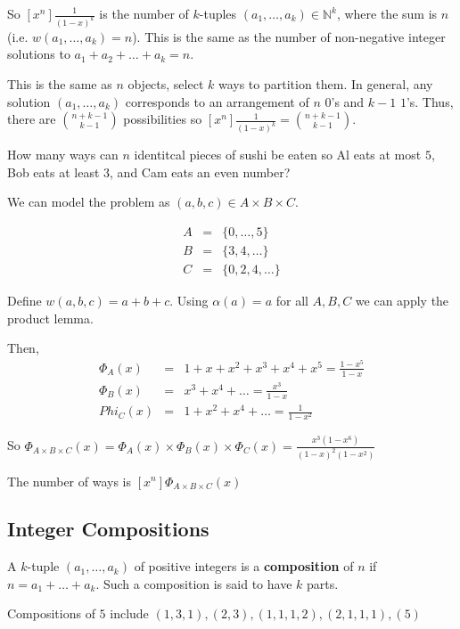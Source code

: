 \documentclass{article}
\begin{document}
So $[x^n] \frac{1}{(1-x)^k}$ is the number of $k$-tuples $(a_1, \dots, a_k) \in \mathbb{N}^k$, where the sum is $n$ (i.e. $w(a_1, \dots, a_k) = n$). This is the same as the number of non-negative integer solutions to $a_1 + a_2 + \dots + a_k = n$.

This is the same as $n$ objects, select $k$ ways to partition them. In general, any solution $(a_1, \dots, a_k)$ corresponds to an arrangement of $n$ $0$'s and $k-1$ $1$'s. Thus, there are $\binom {n + k -1}{k - 1}$ possibilities so $[x^n] \frac{1}{(1-x)^k} = \binom {n+k-1}{k-1}$.

\example
How many ways can $n$ identitcal pieces of sushi be eaten so Al eats at most $5$, Bob eats at least $3$, and Cam eats an even number?

We can model the problem as $(a,b,c) \in A \times B \times C$.

\begin{eqnarray*}
	A &=& \{0, \dots , 5 \} \\
	B &=& \{3,4, \dots \} \\
	C &=& \{ 0,2,4, \dots \}
\end{eqnarray*}

Define $w(a,b,c) = a+b+c$. Using $\alpha(a) = a$ for all $A,B,C$ we can apply the product lemma.

Then, 
\begin{eqnarray*}
	\Phi_{A}(x) &=&  1 + x + x^2 + x^3 + x^4 + x^5 = \frac{1-x^5}{1-x} \\
	\Phi_{B}(x) &=& x^3 + x^4 + \dots = \frac{x^3}{1-x} \\
	Phi_{C}(x) &=& 1 + x^2 + x^4 + \dots = \frac{1}{1-x^2}
\end{eqnarray*}

So $\Phi_{A \times B \times C}(x) = \Phi_A(x) \times \Phi_B(x) \times \Phi_C(x) = \frac{x^3(1-x^6)}{(1-x)^2(1-x^2)}$

The number of ways is $[x^n]\Phi_{A \times B \times C}(x)$

\subsection{Integer Compositions}

\begin{defn}
	A $k$-tuple $(a_1, \dots, a_k)$ of positive integers is a \textbf{composition} of $n$ if $n = a_1 + \dots + a_k$. Such a composition is said to have $k$ parts.
\end{defn}

\example
Compositions of $5$ include $(1,3,1),(2,3),(1,1,1,2),(2,1,1,1),(5)$
\end{document}
